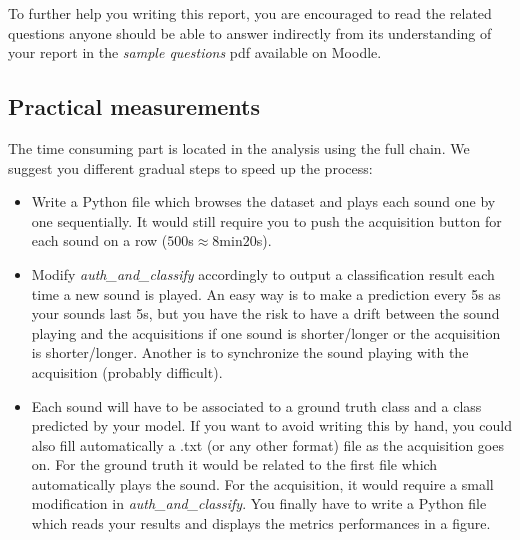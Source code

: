 To further help you writing this report, you are encouraged to read the
related questions anyone should be able to answer indirectly from its understanding of your report in the \emph{sample questions} pdf available on Moodle.

\subsection{Practical measurements}
%
The time consuming part is located in the analysis using the full chain.
We suggest you different gradual steps to speed up the process:
%
\begin{itemize}
    \item Write a Python file which browses the dataset and plays each sound one by
    one sequentially.
    It would still require you to push the acquisition button for each sound on a
    row ($500$s$\approx 8$min$20$s).
    \item Modify \emph{auth\_and\_classify} accordingly to output a classification
    result each time a new sound is played.
    An easy way is to make a prediction every 5s as your sounds last 5s,
    but you have the risk to have a drift between the sound playing and the
    acquisitions if one sound is shorter/longer or the acquisition is shorter/longer.
    Another is to synchronize the sound playing with the acquisition
    (probably difficult).
    \item Each sound will have to be associated to a ground truth class and a class predicted by your model.
    If you want to avoid writing this by hand, you could also fill automatically a
    .txt (or any other format) file as the acquisition goes on.
    For the ground truth it would be related to the first file which automatically
    plays the sound. For the acquisition, it would require a small modification
    in \emph{auth\_and\_classify}.
    You finally have to write a Python file which reads your results and displays
    the metrics performances in a figure.
\end{itemize}
